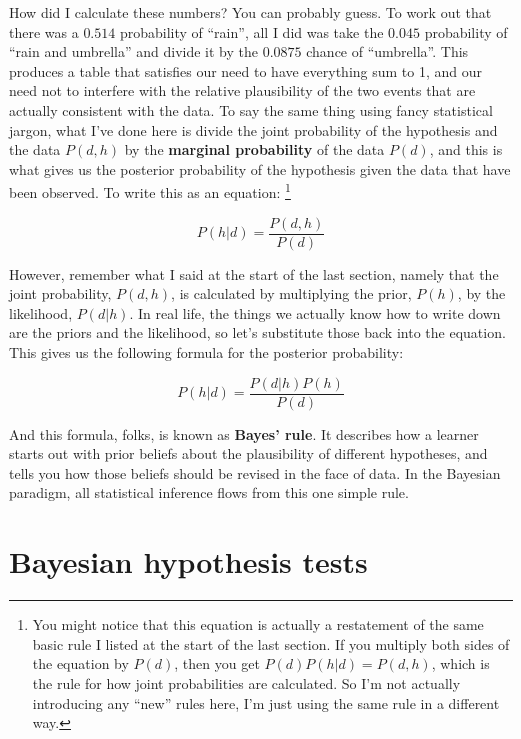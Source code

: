 \documentclass[
  a4paper,
]{book}
\begin{document}
How did I calculate these numbers? You can probably guess. To work out
that there was a \(0.514\) probability of ``rain'', all I did was take
the \(0.045\) probability of ``rain and umbrella'' and divide it by the
\(0.0875\) chance of ``umbrella''. This produces a table that satisfies
our need to have everything sum to 1, and our need not to interfere with
the relative plausibility of the two events that are actually consistent
with the data. To say the same thing using fancy statistical jargon,
what I've done here is divide the joint probability of the hypothesis
and the data \(P(d, h)\) by the \textbf{marginal probability} of the
data \(P(d)\), and this is what gives us the posterior probability of
the hypothesis given the data that have been observed. To write this as
an equation: \footnote{You might notice that this equation is actually a
  restatement of the same basic rule I listed at the start of the last
  section. If you multiply both sides of the equation by \(P(d)\), then
  you get \(P(d)P(h|d) = P(d, h)\), which is the rule for how joint
  probabilities are calculated. So I'm not actually introducing any
  ``new'' rules here, I'm just using the same rule in a different way.}

\[P(h|d)=\frac{P(d,h)}{P(d)}\]

However, remember what I said at the start of the last section, namely
that the joint probability, \(P(d, h)\), is calculated by multiplying
the prior, \(P(h)\), by the likelihood, \(P(d|h)\). In real life, the
things we actually know how to write down are the priors and the
likelihood, so let's substitute those back into the equation. This gives
us the following formula for the posterior probability:

\[P(h|d)=\frac{P(d|h)P(h)}{P(d)}\]

And this formula, folks, is known as \textbf{Bayes' rule}. It describes
how a learner starts out with prior beliefs about the plausibility of
different hypotheses, and tells you how those beliefs should be revised
in the face of data. In the Bayesian paradigm, all statistical inference
flows from this one simple rule.

\hypertarget{bayesian-hypothesis-tests}{%
\section{Bayesian hypothesis tests}\label{bayesian-hypothesis-tests}}
\end{document}
